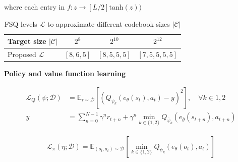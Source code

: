\documentclass{article}
\theoremstyle{plain}
\theoremstyle{definition}
\theoremstyle{remark}
\newcommand{\E}{\mathbb{E}}
\begin{document}
where each entry in  $f : z \rightarrow \left[ L/2 \right] \mathrm{tanh}(z))$


\begin{table}[t]
\caption{FSQ levels $\mathcal{L}$ to approximate different codebook sizes $|\mathcal{C}|$}
\label{sample-table}
\vskip 0.15in
\begin{center}
\begin{small}
\begin{sc}
\begin{tabular}{lccc}
\toprule
Target size $|\mathcal{C}|$ & $2^{8}$ & $2^{10}$ & $2^{12}$ \\
\midrule
Proposed $\mathcal{L}$ & $[8,6,5]$ & $[8,5,5,5]$ & $[7,5,5,5,5]$ \\
\end{tabular}
\end{sc}
\end{small}
\end{center}
\vskip -0.1in
\end{table}



\textbf{Policy and value function learning}

\begin{align} \label{eq:value-loss}
  \mathcal{L}_{Q}(\psi ; \mathcal{D}) &= \E_{\tau \sim \mathcal{D}} \left[ (Q_{\psi_{k}}(e_{\theta}(s_{t}), a_{t}) - y)^{2}  \right], \quad \forall k \in 1, 2 \\
  y &= \sum_{n=0}^{N-1} \gamma^{n} r_{t+n} + \gamma^{n} \min_{k \in \{1,2\}} Q_{\bar{\psi}_{k}}(e_{\bar{\theta}}(s_{t+n}), a_{t+n})
\end{align}

\begin{align} \label{eq:policy-loss}
 \mathcal{L}_{\pi}(\eta; \mathcal{D}) = \E_{(o_{t}, a_{t}) \sim \mathcal{D}} \left[ \min_{k\in\{1,2\}} Q_{\psi_{k}}(e_{\theta}(o_{t}), a_{t}) \right]
\end{align}
\end{document}

